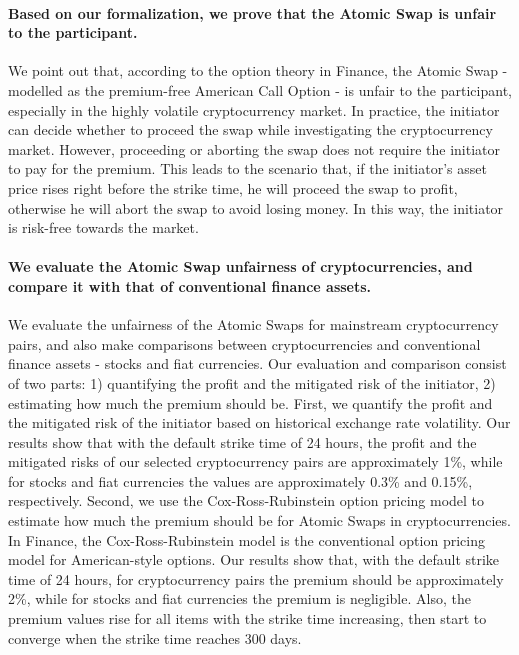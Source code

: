 \paragraph{Based on our formalization, we prove that the Atomic Swap is unfair to the participant.}
We point out that, according to the option theory in Finance, the Atomic Swap - modelled as the premium-free American Call Option - is unfair to the participant, especially in the highly volatile cryptocurrency market.
In practice, the initiator can decide whether to proceed the swap while investigating the cryptocurrency market.
However, proceeding or aborting the swap does not require the initiator to pay for the premium.
This leads to the scenario that, if the initiator's asset price rises right before the strike time, he will proceed the swap to profit, otherwise he will abort the swap to avoid losing money.
In this way, the initiator is risk-free towards the market.

\paragraph{We evaluate the Atomic Swap unfairness of cryptocurrencies, and compare it with that of conventional finance assets.}
We evaluate the unfairness of the Atomic Swaps for mainstream cryptocurrency pairs, and also make comparisons between cryptocurrencies and conventional finance assets - stocks and fiat currencies.
Our evaluation and comparison consist of two parts: 1) quantifying the profit and the mitigated risk of the initiator, 2) estimating how much the premium should be.
First, we quantify the profit and the mitigated risk of the initiator based on historical exchange rate volatility.
Our results show that with the default strike time of 24 hours, the profit and the mitigated risks of our selected cryptocurrency pairs are approximately 1\%, while for stocks and fiat currencies the values are approximately 0.3\% and 0.15\%, respectively.
Second, we use the Cox-Ross-Rubinstein option pricing model to estimate how much the premium should be for Atomic Swaps in cryptocurrencies.
In Finance, the Cox-Ross-Rubinstein model is the conventional option pricing model for American-style options.
Our results show that, with the default strike time of 24 hours, for cryptocurrency pairs the premium should be approximately 2\%, while for stocks and fiat currencies the premium is negligible.
Also, the premium values rise for all items with the strike time increasing, then start to converge when the strike time reaches 300 days.

